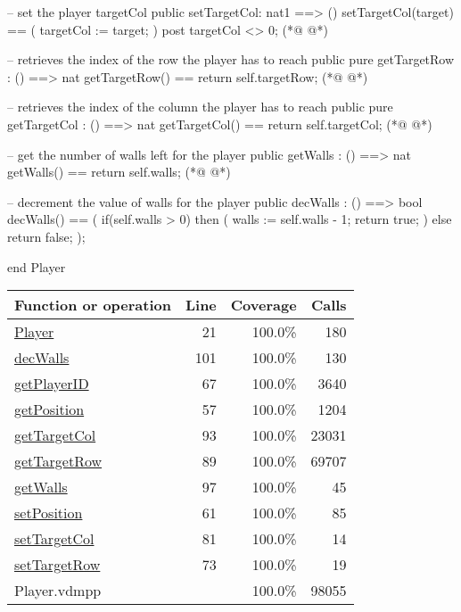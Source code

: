 \begin{vdmpp}[breaklines=true]
   -- set the player targetCol
   public setTargetCol: nat1 ==> ()
   setTargetCol(target) ==
   (
    targetCol := target;
   )
   post targetCol <> 0;
(*@
\label{getTargetRow:89}
@*)
   
   -- retrieves the index of the row the player has to reach
   public pure getTargetRow : () ==> nat
   getTargetRow() == return self.targetRow;
(*@
\label{getTargetCol:93}
@*)
   
   -- retrieves the index of the column the player has to reach
   public pure getTargetCol : () ==> nat
   getTargetCol() == return self.targetCol;
(*@
\label{getWalls:97}
@*)

   -- get the number of walls left for the player
   public getWalls : () ==> nat
   getWalls() == return self.walls;
(*@
\label{decWalls:101}
@*)
   
   -- decrement the value of walls for the player
   public decWalls : () ==> bool
   decWalls() ==
   (
    if(self.walls > 0)
    then 
    (
     walls := self.walls - 1;
     return true;
    )
    else return false;
   );
   
end Player
\end{vdmpp}
\bigskip
\begin{longtable}{|l|r|r|r|}
\hline
Function or operation & Line & Coverage & Calls \\
\hline
\hline
\hyperref[Player:21]{Player} & 21&100.0\% & 180 \\
\hline
\hyperref[decWalls:101]{decWalls} & 101&100.0\% & 130 \\
\hline
\hyperref[getPlayerID:67]{getPlayerID} & 67&100.0\% & 3640 \\
\hline
\hyperref[getPosition:57]{getPosition} & 57&100.0\% & 1204 \\
\hline
\hyperref[getTargetCol:93]{getTargetCol} & 93&100.0\% & 23031 \\
\hline
\hyperref[getTargetRow:89]{getTargetRow} & 89&100.0\% & 69707 \\
\hline
\hyperref[getWalls:97]{getWalls} & 97&100.0\% & 45 \\
\hline
\hyperref[setPosition:61]{setPosition} & 61&100.0\% & 85 \\
\hline
\hyperref[setTargetCol:81]{setTargetCol} & 81&100.0\% & 14 \\
\hline
\hyperref[setTargetRow:73]{setTargetRow} & 73&100.0\% & 19 \\
\hline
\hline
Player.vdmpp & & 100.0\% & 98055 \\
\hline
\end{longtable}

